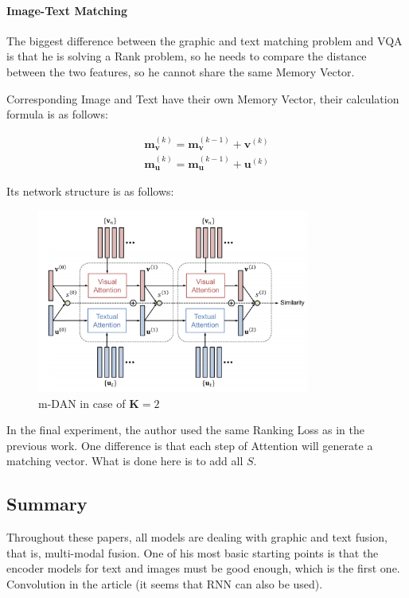 \paragraph{Image-Text Matching}
The biggest difference between the graphic and text matching problem and VQA is that he is solving a Rank problem, so he needs to compare the distance between the two features, so he cannot share the same Memory Vector.

Corresponding Image and Text have their own Memory Vector, their calculation formula is as follows:

$$
\begin{array}{l}
\mathbf{m}_{\mathbf{v}}^{(k)}=\mathbf{m}_{\mathbf{v}}^{(k-1)}+\mathbf{v}^{(k)} \\
\mathbf{m}_{\mathbf{u}}^{(k)}=\mathbf{m}_{\mathbf{u}}^{(k-1)}+\mathbf{u}^{(k)}
\end{array}
$$

Its network structure is as follows:

\begin{figure}[h!]
\centering
\includegraphics[width=0.8\textwidth]{dan3.pdf}
\caption{m-DAN in case of $\mathbf{K}=2$ \cite{dan}}
\label{fig:dan3}
\end{figure}

In the final experiment, the author used the same Ranking Loss as in the previous work. One difference is that each step of Attention will generate a matching vector. What is done here is to add all $S$.

\subsection{Summary}
Throughout these papers, all models are dealing with graphic and text fusion, that is, multi-modal fusion. One of his most basic starting points is that the encoder models for text and images must be good enough, which is the first one. Convolution in the article (it seems that RNN can also be used).

